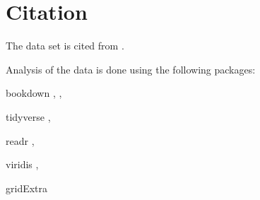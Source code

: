 \documentclass[11pt,a4paper,]{article}
\begin{document}
\section*{Citation}

The data set is cited from \textcite{owidmeatproduction}.

Analysis of the data is done using the following packages:

bookdown \textcite{bookdown1}, \textcite{bookdown2},

tidyverse \textcite{tidyverse},

readr \textcite{readr},

viridis \textcite{viridis},

gridExtra \textcite{gridExtra}

\printbibliography
\end{document}
